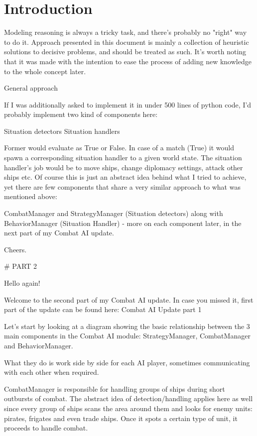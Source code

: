 \chapter{Introduction}

\begin{par}
Modeling reasoning is always a tricky task, and there's probably no "right" way to do it. 
Approach presented in this document is mainly a collection of heuristic solutions to decisive problems, and should be treated as such. It's worth noting that it was made with the intention to ease the process of adding new knowledge to the whole concept later.
\end{par}

General approach

If I was additionally asked to implement it in under 500 lines of python code, I'd probably implement two kind of components here:

    Situation detectors
    Situation handlers

Former would evaluate as True or False. 
In case of a match (True) it would spawn a corresponding situation handler to a given world state. 
The situation handler's job would be to move ships, change diplomacy settings, attack other ships etc. 
Of course this is just an abstract idea behind what I tried to achieve, yet there are few components that share a very similar approach to what was mentioned above:


CombatManager and StrategyManager (Situation detectors) along with BehaviorManager (Situation Handler) - more on each component later, in the next part of my Combat AI update.

Cheers.

# PART 2 



Hello again!

Welcome to the second part of my Combat AI update. In case you missed it, first part of the update can be found here: Combat AI Update part 1

Let's start by looking at a diagram showing the basic relationship between the 3 main components in the Combat AI module: StrategyManager, CombatManager and BehaviorManager.

What they do is work side by side for each AI player, sometimes communicating with each other when required.

CombatManager is responsible for handling groups of ships during short outbursts of combat. The abstract idea of detection/handling applies here as well since every group of ships scans the area around them and looks for enemy units: pirates, frigates and even trade ships. Once it spots a certain type of unit, it proceeds to handle combat.

